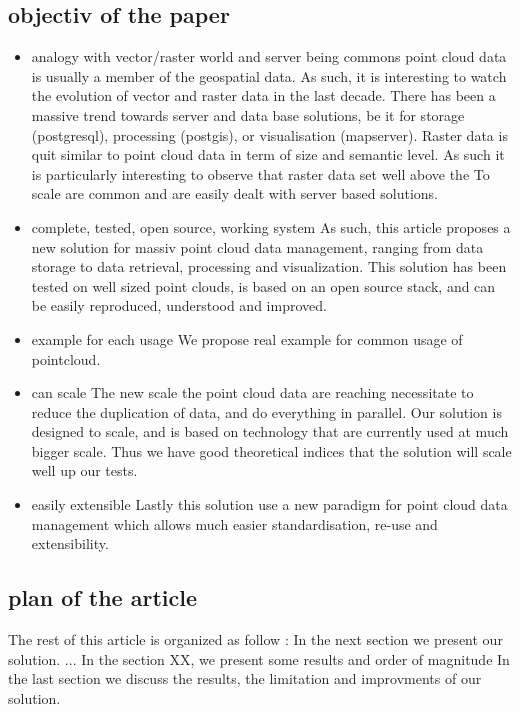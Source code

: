 	\subsection{objectiv of the paper}
		\begin{itemize}
			\item analogy with vector/raster world and server being commons
				point cloud data is usually a member of the geospatial data. 
				As such, it is interesting to watch the evolution of vector and raster data in the last decade.
				There has been a massive trend towards server and data base solutions, be it for storage (postgresql), processing (postgis), or visualisation (mapserver).
				Raster data is quit similar to point cloud data in term of size and semantic level. As such it is particularly interesting to observe that raster data set well above the To scale are common and are easily dealt with server based solutions.
			\item complete, tested, open source, working system
				As such, this article proposes a new solution for massiv point cloud data management, ranging from data storage to data retrieval, processing and visualization.
				This solution has been tested on well sized point clouds, is based on an open source stack, and can be easily reproduced, understood and improved. 
			\item example for each usage
				We propose real example for common usage of pointcloud.
			\item can scale
				The new scale the point cloud data are reaching necessitate to reduce the duplication of data, and do everything in parallel.  
				Our solution is designed to scale, and is based on technology that are currently used at much bigger scale. Thus we have good theoretical indices that the solution will scale well up our tests.
			\item easily extensible
				Lastly this solution use a new paradigm for point cloud data management which allows much easier standardisation, re-use and extensibility.
		\end{itemize}  
	\subsection{plan of the article}
		The rest of this article is organized as follow :
		In the next section we present our solution.
		...
		In the section XX, we present some results and order of magnitude
		In the last section we discuss the results, the limitation and improvments of our solution.